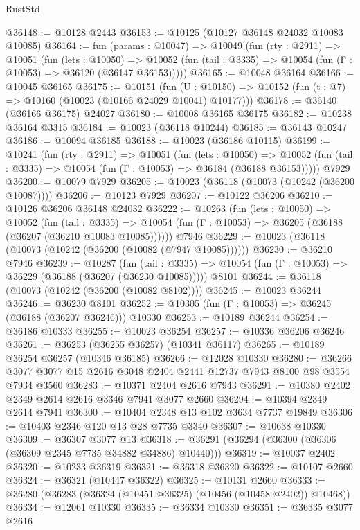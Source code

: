 \begin{lexlean}{RustStd}
\begin{coremodule}
@36148 := @10128 @2443
@36153 := @10125 (@10127 @36148 @24032 @10083 @10085)
@36164 := fun (params : @10047) =>
  @10049
    (fun (rty : @2911) =>
    @10051
      (fun (lets : @10050) =>
      @10052 (fun (tail : @3335) => @10054 (fun (Γ : @10053) => @36120 (@36147 @36153)))))
@36165 := @10048 @36164
@36166 := @10045 @36165
@36175 := @10151
    (fun (U : @10150) => @10152 (fun (t : @7) => @10160 (@10023 (@10166 @24029 @10041) @10177)))
@36178 := @36140 (@36166 @36175) @24027
@36180 := @10008 @36165 @36175
@36182 := @10238 @36164 @3315
@36184 := @10023 (@36118 @10244)
@36185 := @36143 @10247
@36186 := @10094 @36185
@36188 := @10023 (@36186 @10115)
@36199 := @10241
    (fun (rty : @2911) =>
    @10051
      (fun (lets : @10050) =>
      @10052 (fun (tail : @3335) => @10054 (fun (Γ : @10053) => @36184 (@36188 @36153)))))
    @7929
@36200 := @10079 @7929
@36205 := @10023 (@36118 (@10073 (@10242 (@36200 @10087))))
@36206 := @10123 @7929
@36207 := @10122 @36206
@36210 := @10126 @36206 @36148 @24032
@36222 := @10263
    (fun (lets : @10050) =>
    @10052
      (fun (tail : @3335) =>
      @10054 (fun (Γ : @10053) => @36205 (@36188 (@36207 (@36210 @10083 @10085))))))
    @7946
@36229 := @10023 (@36118 (@10073 (@10242 (@36200 (@10082 (@7947 @10085))))))
@36230 := @36210 @7946
@36239 := @10287
    (fun (tail : @3335) => @10054 (fun (Γ : @10053) => @36229 (@36188 (@36207 (@36230 @10085)))))
    @8101
@36244 := @36118 (@10073 (@10242 (@36200 (@10082 @8102))))
@36245 := @10023 @36244
@36246 := @36230 @8101
@36252 := @10305 (fun (Γ : @10053) => @36245 (@36188 (@36207 @36246))) @10330
@36253 := @10189 @36244
@36254 := @36186 @10333
@36255 := @10023 @36254
@36257 := @10336 @36206 @36246
@36261 := @36253 (@36255 @36257) (@10341 @36117)
@36265 := @10189 @36254 @36257 (@10346 @36185)
@36266 := @12028 @10330
@36280 := @36266 @3077 @3077 @15 @2616 @3048 @2404 @2441 @12737 @7943 @8100 @98 @3554 @7934 @3560
@36283 := @10371 @2404 @2616 @7943
@36291 := @10380 @2402 @2349 @2614 @2616 @3346 @7941 @3077 @2660
@36294 := @10394 @2349 @2614 @7941
@36300 := @10404 @2348 @13 @102 @3634 @7737 @19849
@36306 := @10403 @2346 @120 @13 @28 @7735 @3340
@36307 := @10638 @10330
@36309 := @36307 @3077 @13
@36318 := @36291 (@36294 (@36300 (@36306 (@36309 @2345 @7735 @34882 @34886) @10440)))
@36319 := @10037 @2402
@36320 := @10233 @36319
@36321 := @36318 @36320
@36322 := @10107 @2660
@36324 := @36321 (@10447 @36322)
@36325 := @10131 @2660
@36333 := @36280 (@36283 (@36324 (@10451 @36325) (@10456 (@10458 @2402)) @10468))
@36334 := @12061 @10330
@36335 := @36334 @10330
@36351 := @36335
    @3077
    @2616

\end{coremodule}
\end{lexlean}
